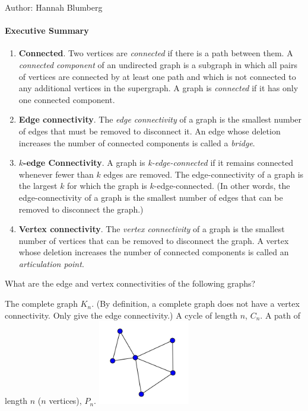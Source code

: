 \documentclass[solution, letterpaper]{cs20inclass}
\begin{document}

\noindent Author: Hannah Blumberg

\paragraph*{Executive Summary}
\begin{enumerate}
  \item \textbf{Connected}. Two vertices are \emph{connected} if there is a path between them. A \emph{connected component} of an undirected graph is a subgraph in which all pairs of vertices are connected by at least one path and which is not connected to any additional vertices in the supergraph. A graph is \emph{connected} if it has only one connected component. 

  \item \textbf{Edge connectivity}. The \emph{edge connectivity} of a graph is the smallest number of edges that must be removed to disconnect it. An edge whose deletion increases the number of connected components is called a \emph{bridge}.  

  \item \textbf{$k$-edge Connectivity}. A graph is \emph{k-edge-connected} if it remains connected whenever fewer than $k$ edges are removed. The edge-connectivity of a graph is the largest $k$ for which the graph is $k$-edge-connected. (In other words, the edge-connectivity of a graph is the smallest number of edges that can be removed to disconnect the graph.)

  \item \textbf{Vertex connectivity}. The \textit{vertex connectivity} of a graph is the smallest number of vertices that can be removed to disconnect the graph. A vertex whose deletion increases the number of connected components is called an \emph{articulation point}.
\end{enumerate}

\problem
What are the edge and vertex connectivities of the following graphs?

\subproblem The complete graph $K_n$. (By definition, a complete graph does not have a vertex connectivity. Only give the edge connectivity.)
\subproblem A cycle of length $n$, $C_n$.
\subproblem A path of length $n$ ($n$ vertices), $P_n$.
\subproblem \includegraphics[width=4cm]{class21-1}
\end{document}
